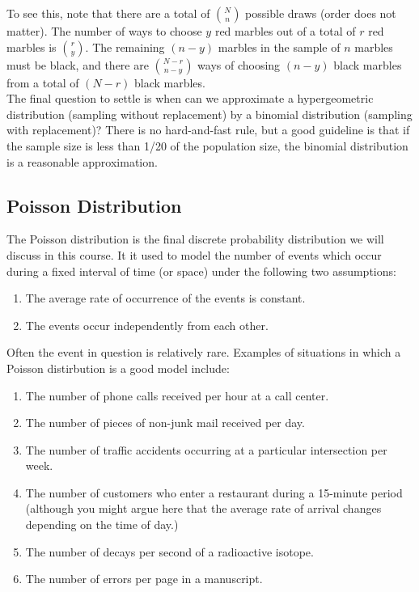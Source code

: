 \documentclass[12pt]{article}
\theoremstyle{definition}
\theoremstyle{remark}
\begin{document}
To see this, note that there are a total of $\binom{N}{n}$ possible draws (order does not matter). The number of ways to choose $y$ red marbles out of a total of $r$ red marbles is $\binom{r}{y}$. The remaining $(n - y)$ marbles in the sample of $n$ marbles must be black, and there are $\binom{N - r}{n - y}$ ways of choosing $(n - y)$ black marbles from a total of $(N - r)$ black marbles. \\

The final question to settle is when can we approximate a hypergeometric distribution (sampling without replacement) by a binomial distribution (sampling with replacement)? There is no hard-and-fast rule, but a good guideline is that if the sample size is less than 1/20 of the population size, the binomial distribution is a reasonable approximation. 

\subsection{Poisson Distribution}

The Poisson distribution is the final discrete probability distribution we will discuss in this course. It it used to model the number of events which occur during a fixed interval of time (or space) under the following two assumptions:
\begin{enumerate}
\item The average rate of occurrence of the events is constant.
\item The events occur independently from each other.
\end{enumerate}
Often the event in question is relatively rare. Examples of situations in which a Poisson distirbution is a good model include:
\begin{enumerate}
\item The number of phone calls received per hour at a call center.
\item The number of pieces of non-junk mail received per day.
\item The number of traffic accidents occurring at a particular intersection per week.
\item The number of customers who enter a restaurant during a 15-minute period (although you might argue here that the average rate of arrival changes depending on the time of day.)
\item The number of decays per second of a radioactive isotope.
\item The number of errors per page in a manuscript.
\end{enumerate}
\end{document}
